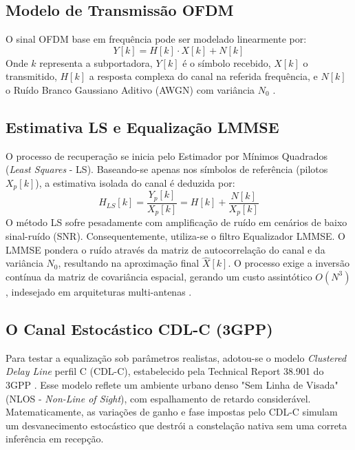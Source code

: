\documentclass[conference]{IEEEtran}
\begin{document}
\subsection{Modelo de Transmissão OFDM}
O sinal OFDM base em frequência pode ser modelado linearmente por:
\begin{equation}
    Y[k] = H[k] \cdot X[k] + N[k]
\end{equation}
Onde $k$ representa a subportadora, $Y[k]$ é o símbolo recebido, $X[k]$ o transmitido, $H[k]$ a resposta complexa do canal na referida frequência, e $N[k]$ o Ruído Branco Gaussiano Aditivo (AWGN) com variância $N_0$ \cite{proakis2008}.

\subsection{Estimativa LS e Equalização LMMSE}
O processo de recuperação se inicia pelo Estimador por Mínimos Quadrados (\textit{Least Squares} - LS). Baseando-se apenas nos símbolos de referência (pilotos $X_p[k]$), a estimativa isolada do canal é deduzida por:
\begin{equation}
    \hat{H}_{LS}[k] = \frac{Y_p[k]}{X_p[k]} = H[k] + \frac{N[k]}{X_p[k]}
\end{equation}
O método LS sofre pesadamente com amplificação de ruído em cenários de baixo sinal-ruído (SNR). Consequentemente, utiliza-se o filtro Equalizador LMMSE. O LMMSE pondera o ruído através da matriz de autocorrelação do canal e da variância $N_0$, resultando na aproximação final $\hat{X}[k]$. O processo exige a inversão contínua da matriz de covariância espacial, gerando um custo assintótico $O(N^3)$, indesejado em arquiteturas multi-antenas \cite{vanDeBeek1995}.

\subsection{O Canal Estocástico CDL-C (3GPP)}
Para testar a equalização sob parâmetros realistas, adotou-se o modelo \textit{Clustered Delay Line} perfil C (CDL-C), estabelecido pela Technical Report 38.901 do 3GPP \cite{3gpp38901}. Esse modelo reflete um ambiente urbano denso "Sem Linha de Visada" (NLOS - \textit{Non-Line of Sight}), com espalhamento de retardo considerável. Matematicamente, as variações de ganho e fase impostas pelo CDL-C simulam um desvanecimento estocástico que destrói a constelação nativa sem uma correta inferência em recepção.

\end{document}
